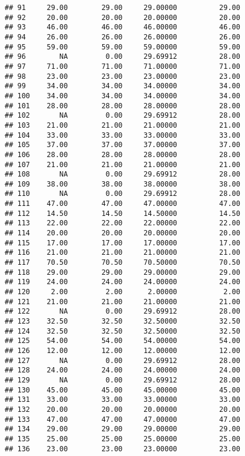 \documentclass[
]{article}
\begin{document}
\begin{verbatim}
## 91     29.00        29.00     29.00000          29.00
## 92     20.00        20.00     20.00000          20.00
## 93     46.00        46.00     46.00000          46.00
## 94     26.00        26.00     26.00000          26.00
## 95     59.00        59.00     59.00000          59.00
## 96        NA         0.00     29.69912          28.00
## 97     71.00        71.00     71.00000          71.00
## 98     23.00        23.00     23.00000          23.00
## 99     34.00        34.00     34.00000          34.00
## 100    34.00        34.00     34.00000          34.00
## 101    28.00        28.00     28.00000          28.00
## 102       NA         0.00     29.69912          28.00
## 103    21.00        21.00     21.00000          21.00
## 104    33.00        33.00     33.00000          33.00
## 105    37.00        37.00     37.00000          37.00
## 106    28.00        28.00     28.00000          28.00
## 107    21.00        21.00     21.00000          21.00
## 108       NA         0.00     29.69912          28.00
## 109    38.00        38.00     38.00000          38.00
## 110       NA         0.00     29.69912          28.00
## 111    47.00        47.00     47.00000          47.00
## 112    14.50        14.50     14.50000          14.50
## 113    22.00        22.00     22.00000          22.00
## 114    20.00        20.00     20.00000          20.00
## 115    17.00        17.00     17.00000          17.00
## 116    21.00        21.00     21.00000          21.00
## 117    70.50        70.50     70.50000          70.50
## 118    29.00        29.00     29.00000          29.00
## 119    24.00        24.00     24.00000          24.00
## 120     2.00         2.00      2.00000           2.00
## 121    21.00        21.00     21.00000          21.00
## 122       NA         0.00     29.69912          28.00
## 123    32.50        32.50     32.50000          32.50
## 124    32.50        32.50     32.50000          32.50
## 125    54.00        54.00     54.00000          54.00
## 126    12.00        12.00     12.00000          12.00
## 127       NA         0.00     29.69912          28.00
## 128    24.00        24.00     24.00000          24.00
## 129       NA         0.00     29.69912          28.00
## 130    45.00        45.00     45.00000          45.00
## 131    33.00        33.00     33.00000          33.00
## 132    20.00        20.00     20.00000          20.00
## 133    47.00        47.00     47.00000          47.00
## 134    29.00        29.00     29.00000          29.00
## 135    25.00        25.00     25.00000          25.00
## 136    23.00        23.00     23.00000          23.00

\end{verbatim}
\end{document}
